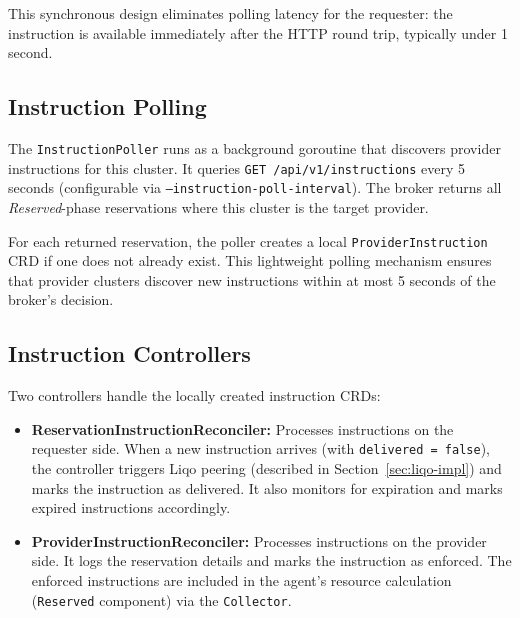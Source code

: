 This synchronous design eliminates polling latency for the requester: the instruction is available immediately after the HTTP round trip, typically under 1 second.

\subsection{Instruction Polling}
\label{subsec:instruction-polling}

The \texttt{InstructionPoller} runs as a background goroutine that discovers provider instructions for this cluster. It queries \texttt{GET /api/v1/instructions} every 5 seconds (configurable via \texttt{--instruction-poll-interval}). The broker returns all \textit{Reserved}-phase reservations where this cluster is the target provider.

For each returned reservation, the poller creates a local \texttt{ProviderInstruction} CRD if one does not already exist. This lightweight polling mechanism ensures that provider clusters discover new instructions within at most 5 seconds of the broker's decision.

\subsection{Instruction Controllers}
\label{subsec:instruction-controllers}

Two controllers handle the locally created instruction CRDs:

\begin{itemize}
    \item \textbf{ReservationInstructionReconciler:} Processes instructions on the requester side. When a new instruction arrives (with \texttt{delivered = false}), the controller triggers Liqo peering (described in Section~\ref{sec:liqo-impl}) and marks the instruction as delivered. It also monitors for expiration and marks expired instructions accordingly.

    \item \textbf{ProviderInstructionReconciler:} Processes instructions on the provider side. It logs the reservation details and marks the instruction as enforced. The enforced instructions are included in the agent's resource calculation (\texttt{Reserved} component) via the \texttt{Collector}.
\end{itemize}


